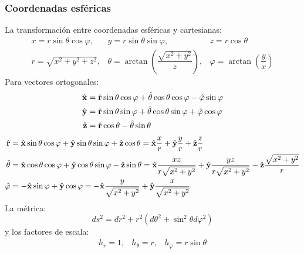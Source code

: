 \documentclass[]{article}
\numberwithin{equation}{section}
\begin{document}
\subsubsection{Coordenadas esféricas}
La transformación entre coordenadas esféricas y cartesianas:
\begin{equation}
	\begin{matrix}
		x = r\sin\theta\cos\varphi,& y = r\sin\theta\sin\varphi,& z = r\cos\theta\\
		r = \sqrt{x^2 + y^2 + z^2},& \theta = \arctan\left(\dfrac{\sqrt{x^2 + y^2}}{z}\right), & \varphi = \arctan\left(\dfrac{y}{x}\right)
	\end{matrix}
\end{equation}
Para vectores ortogonales:
\begin{align}
	\hat{\mathbf{x}} &= \hat{\mathbf{r}}\sin\theta\cos\varphi + \hat{\mathbf{\theta}}\cos\theta\cos\varphi - \hat{\mathbf{\varphi}}\sin\varphi \\
	\hat{\mathbf{y}} &= \hat{\mathbf{r}}\sin\theta\sin\varphi + \hat{\mathbf{\theta}}\cos\theta\sin\varphi + \hat{\mathbf{\varphi}}\cos\varphi\\
	\hat{\mathbf{z}} &= \hat{\mathbf{r}}\cos\theta - \hat{\mathbf{\theta}}\sin\theta
\end{align}
\begin{align}
	\hat{\mathbf{r}} &= \hat{\mathbf{x}}\sin\theta\cos\varphi + \hat{\mathbf{y}}\sin\theta\sin\varphi + \hat{\mathbf{z}}\cos\theta = \hat{\mathbf{x}}\dfrac{x}{r} + \hat{\mathbf{y}}\dfrac{y}{r} + \hat{\mathbf{z}}\dfrac{z}{r}\\
	\hat{\mathbf{\theta}} &= \hat{\mathbf{x}}\cos\theta\cos\varphi + \hat{\mathbf{y}}\cos\theta\sin\varphi - \hat{\mathbf{z}}\sin\theta = \hat{\mathbf{x}}\dfrac{x z}{r\sqrt{x^2+y^2}} + \hat{\mathbf{y}}\dfrac{y z}{r\sqrt{x^2+y^2}} - \hat{\mathbf{z}}\dfrac{\sqrt{x^2+y^2}}{r}\\
	\hat{\mathbf{\varphi}} &= - \hat{\mathbf{x}}\sin\varphi + \hat{\mathbf{y}}\cos\varphi = - \hat{\mathbf{x}}\dfrac{y}{\sqrt{x^2+y^2}} + \hat{\mathbf{y}}\dfrac{x}{\sqrt{x^2+y^2}}
\end{align}
La métrica:
\begin{equation}
	ds^2 = dr^2 + r^2\left(d\theta^2 + \sin^2\theta d\varphi^2\right)
\end{equation}
y los factores de escala:
\begin{equation}
	\begin{matrix}
		h_r = 1, & h_\theta = r, & h_\varphi = r\sin\theta
	\end{matrix}
\end{equation}
\end{document}
